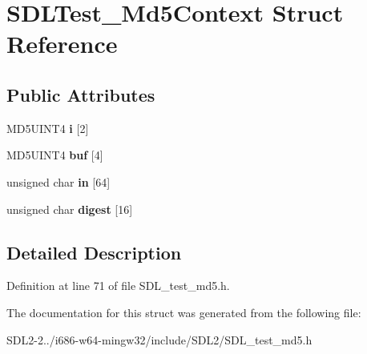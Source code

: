 \hypertarget{structSDLTest__Md5Context}{\section{S\+D\+L\+Test\+\_\+\+Md5\+Context Struct Reference}
\label{structSDLTest__Md5Context}
}
\subsection*{Public Attributes}
\begin{DoxyCompactItemize}
\item 
\hypertarget{structSDLTest__Md5Context_acb9d8921f6cb104fdcda99e99f6647ee}{M\+D5\+U\+I\+N\+T4 {\bfseries i} \mbox{[}2\mbox{]}}\label{structSDLTest__Md5Context_acb9d8921f6cb104fdcda99e99f6647ee}

\item 
\hypertarget{structSDLTest__Md5Context_a813711c2dff50571515147c5bcd54237}{M\+D5\+U\+I\+N\+T4 {\bfseries buf} \mbox{[}4\mbox{]}}\label{structSDLTest__Md5Context_a813711c2dff50571515147c5bcd54237}

\item 
\hypertarget{structSDLTest__Md5Context_a210f33aa1c924df7b4ee1430cf98b897}{unsigned char {\bfseries in} \mbox{[}64\mbox{]}}\label{structSDLTest__Md5Context_a210f33aa1c924df7b4ee1430cf98b897}

\item 
\hypertarget{structSDLTest__Md5Context_aeec0b85f4d5186e21bb117c30f495e4a}{unsigned char {\bfseries digest} \mbox{[}16\mbox{]}}\label{structSDLTest__Md5Context_aeec0b85f4d5186e21bb117c30f495e4a}

\end{DoxyCompactItemize}


\subsection{Detailed Description}


Definition at line 71 of file S\+D\+L\+\_\+test\+\_\+md5.\+h.



The documentation for this struct was generated from the following file\+:\begin{DoxyCompactItemize}
\item 
S\+D\+L2-\/2../i686-\/w64-\/mingw32/include/\+S\+D\+L2/S\+D\+L\+\_\+test\+\_\+md5.\+h\end{DoxyCompactItemize}
